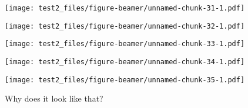 \documentclass[
  ignorenonframetext,
]{beamer}
\begin{document}
\begin{frame}

\texttt{[image: test2\_files/figure-beamer/unnamed-chunk-31-1.pdf]}

\end{frame}

\begin{frame}

\texttt{[image: test2\_files/figure-beamer/unnamed-chunk-32-1.pdf]}

\end{frame}

\begin{frame}

\texttt{[image: test2\_files/figure-beamer/unnamed-chunk-33-1.pdf]}

\end{frame}

\begin{frame}

\texttt{[image: test2\_files/figure-beamer/unnamed-chunk-34-1.pdf]}

\end{frame}

\begin{frame}

\texttt{[image: test2\_files/figure-beamer/unnamed-chunk-35-1.pdf]}

\end{frame}

\begin{frame}{Why does it look like that?}
\protect\hypertarget{why-does-it-look-like-that}{}

\begin{table}[H]
\centering
{}
\end{table}

\end{frame}
\end{document}
